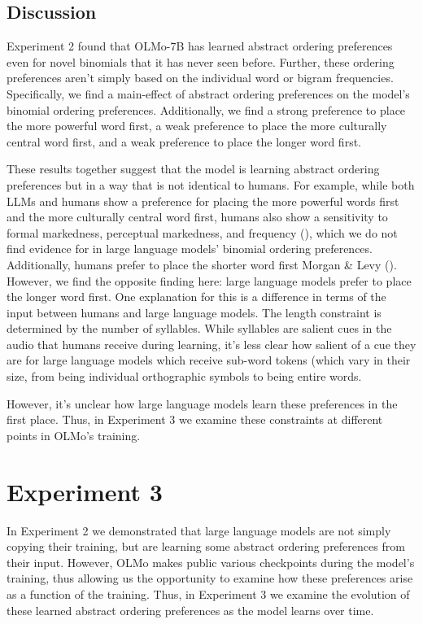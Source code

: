\documentclass[
  12pt,
  letterpaper,
]{scrreport}
\begin{document}
\subsection{Discussion}\label{discussion-6}

Experiment 2 found that OLMo-7B has learned abstract ordering
preferences even for novel binomials that it has never seen before.
Further, these ordering preferences aren't simply based on the
individual word or bigram frequencies. Specifically, we find a
main-effect of abstract ordering preferences on the model's binomial
ordering preferences. Additionally, we find a strong preference to place
the more powerful word first, a weak preference to place the more
culturally central word first, and a weak preference to place the longer
word first.

These results together suggest that the model is learning abstract
ordering preferences but in a way that is not identical to humans. For
example, while both LLMs and humans show a preference for placing the
more powerful words first and the more culturally central word first,
humans also show a sensitivity to formal markedness, perceptual
markedness, and frequency
(), which we do not find evidence for in large language models'
binomial ordering preferences. Additionally, humans prefer to place the
shorter word first Morgan \& Levy ().
However, we find the opposite finding here: large language models prefer
to place the longer word first. One explanation for this is a difference
in terms of the input between humans and large language models. The
length constraint is determined by the number of syllables. While
syllables are salient cues in the audio that humans receive during
learning, it's less clear how salient of a cue they are for large
language models which receive sub-word tokens (which vary in their size,
from being individual orthographic symbols to being entire words.

However, it's unclear how large language models learn these preferences
in the first place. Thus, in Experiment 3 we examine these constraints
at different points in OLMo's training.

\section{Experiment 3}\label{experiment-3-1}

In Experiment 2 we demonstrated that large language models are not
simply copying their training, but are learning some abstract ordering
preferences from their input. However, OLMo makes public various
checkpoints during the model's training, thus allowing us the
opportunity to examine how these preferences arise as a function of the
training. Thus, in Experiment 3 we examine the evolution of these
learned abstract ordering preferences as the model learns over time.
\end{document}
